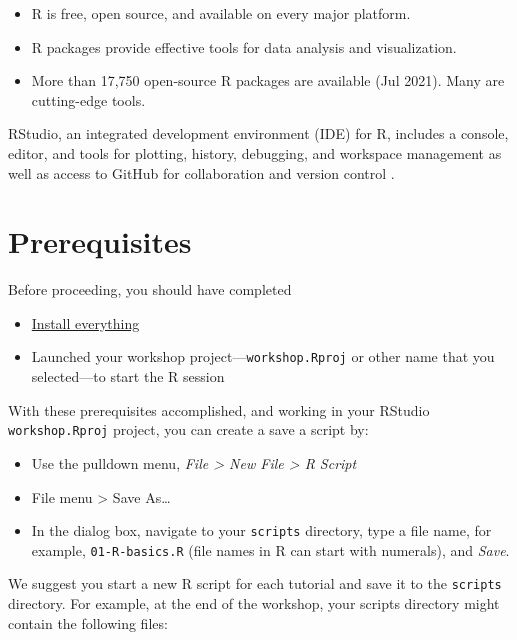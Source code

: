 \documentclass[
]{book}
\providecommand{\tightlist}{%
  \setlength{\itemsep}{0pt}\setlength{\parskip}{0pt}}
\begin{document}
\begin{itemize}
\tightlist
\item
  R is free, open source, and available on every major platform.
\item
  R packages provide effective tools for data analysis and visualization.
\item
  More than 17,750 open-source R packages are available (Jul 2021). Many are cutting-edge tools.
\end{itemize}

RStudio, an integrated development environment (IDE) for R, includes a console, editor, and tools for plotting, history, debugging, and workspace management as well as access to GitHub for collaboration and version control \citep{2016rstudio}.

\hypertarget{prerequisites}{%
\section{Prerequisites}\label{prerequisites}}

Before proceeding, you should have completed

\begin{itemize}
\tightlist
\item
  \protect\hyperlink{install-everything}{Install everything}\\
\item
  Launched your workshop project---\texttt{workshop.Rproj} or other name that you selected---to start the R session
\end{itemize}

With these prerequisites accomplished, and working in your RStudio \texttt{workshop.Rproj} project, you can create a save a script by:

\begin{itemize}
\tightlist
\item
  Use the pulldown menu, \emph{File \textgreater{} New File \textgreater{} R Script}
\item
  File menu \textgreater{} Save As\ldots{}
\item
  In the dialog box, navigate to your \texttt{scripts} directory, type a file name, for example, \texttt{01-R-basics.R} (file names in R can start with numerals), and \emph{Save}.
\end{itemize}

We suggest you start a new R script for each tutorial and save it to the \texttt{scripts} directory. For example, at the end of the workshop, your scripts directory might contain the following files:
\end{document}
